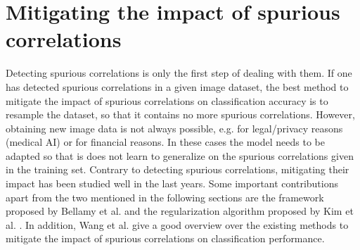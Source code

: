 \documentclass{article}
\begin{document}
\section{Mitigating the impact of spurious correlations}
\label{sec:mitigatingscs}
Detecting spurious correlations is only the first step of dealing with them. If one has detected
spurious correlations in a given image dataset, the best method to mitigate the impact of spurious correlations
on classification accuracy is to resample the dataset, so that it contains no more spurious correlations.
However, obtaining new image data is not always possible, e.g. for legal/privacy reasons (medical AI) or for
financial reasons. In these cases the model needs to be adapted so that is does not learn to generalize on the
spurious correlations given in the training set. Contrary to detecting spurious correlations, mitigating their
impact has been studied well in the last years. Some important contributions apart from the two mentioned in
the following sections are the framework proposed by Bellamy et al. \cite{bellamy2018ai} and the regularization
algorithm proposed by Kim et al. \cite{Kim_2019_CVPR}. In addition, Wang et al. \cite{Wang_2020_CVPR} give a
good overview over the existing methods to mitigate the impact of spurious correlations on classification performance.
\end{document}
